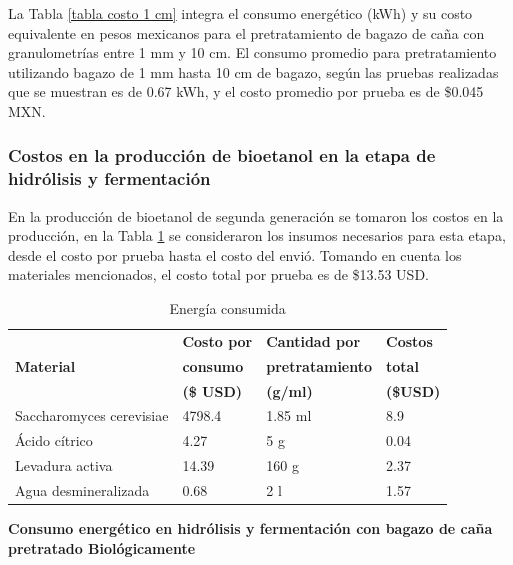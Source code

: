 \documentclass[12pt]{article}
\begin{document}
	
	La Tabla \ref{tabla costo 1 cm} integra el consumo energético (kWh) y su costo equivalente en pesos mexicanos para el pretratamiento de bagazo de caña con granulometrías entre 1 mm y 10 cm. El consumo promedio para pretratamiento utilizando bagazo de 1 mm hasta 10 cm de bagazo, según las pruebas realizadas que se muestran es de 0.67 kWh, y el costo promedio por prueba es de \$0.045 MXN.
	
	
	\subsubsection{Costos en la producción de bioetanol en la etapa de hidrólisis y fermentación}
	
	En la producción de bioetanol de segunda generación se tomaron los costos en la producción, en la Tabla \ref{hidrolisis costos} se consideraron los insumos necesarios para esta etapa, desde el costo por prueba hasta el costo del envió. Tomando en cuenta los materiales mencionados, el costo total por prueba es de \$13.53 USD.
	
			
			
		\begin{table}[H]
			\centering
			\caption{Energía consumida}
			\label{hidrolisis costos}
			\begin{tabular}{|l|l|l|l|}
				\hline
				 & \textbf{Costo por} & \textbf{Cantidad por }  & \textbf{Costos} \\
				\textbf{Material} & \textbf{ consumo } & \textbf{ pretratamiento}  & \textbf{total} \\ 
				& \textbf{ (\$ USD)} & \textbf{ (g/ml)}  & \textbf{(\$USD)} \\ \hline
				Saccharomyces cerevisiae &4798.4 & 1.85 ml  & 8.9 \\ \hline
				Ácido cítrico & 4.27& 5 g  &0.04 \\ \hline
				Levadura activa &14.39 &160 g  & 2.37 \\ \hline
				Agua desmineralizada & 0.68  &2 l  & 1.57 \\ \hline
			\end{tabular}
		\end{table}
			
			
	\textbf{ Consumo energético en hidrólisis y fermentación con bagazo de caña pretratado Biológicamente }
	
\end{document}
